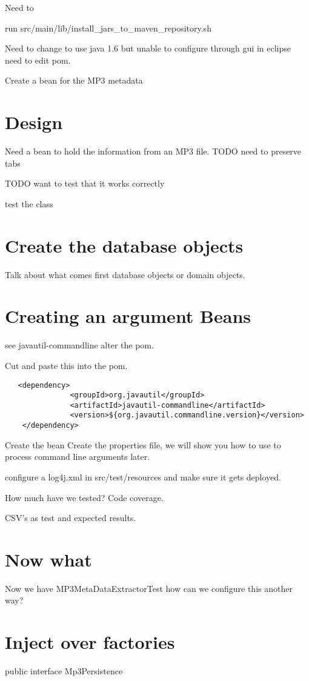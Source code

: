 \documentclass[a4paper,10pt]{book}
\begin{document}
Need to

run src/main/lib/install_jars_to_maven_repository.sh 

Need to change to use java 1.6 but unable to configure through gui in eclipse need to edit pom.

Create a bean for the MP3 metadata 

\section{Design}
Need a bean to hold the information from an MP3 file.
TODO need to preserve tabs

TODO want to test that it works correctly

test the class

\section{Create the database objects}
Talk about what comes first database objects or domain objects.

\section{Creating an argument Beans}
see javautil-commandline
alter the pom.

Cut and paste this into the pom.
\begin{verbatim}
   <dependency>
               <groupId>org.javautil</groupId>
               <artifactId>javautil-commandline</artifactId>
               <version>${org.javautil.commandline.version}</version>
    </dependency>
\end{verbatim}
Create the bean
Create the properties file, we will show you how to use to process command line arguments later.

configure a log4j.xml in src/test/resources and make sure it gets deployed.

How much have we tested?  Code coverage.

CSV's as test and expected results.

\section{Now what}
Now we have MP3MetaDataExtractorTest how can we configure this another way?

\section{Inject over factories}
public interface Mp3Persistence
\end{document}
